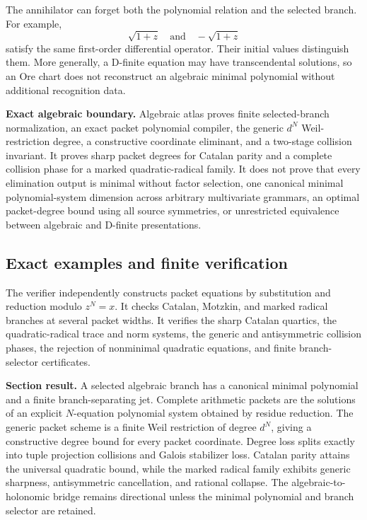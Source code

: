 The annihilator can forget both the polynomial relation and the selected branch.  For example,
\[
 \sqrt{1+z}
 \quad\text{and}\quad
 -\sqrt{1+z}
\]
satisfy the same first-order differential operator.  Their initial values distinguish them.  More generally, a D-finite equation may have transcendental solutions, so an Ore chart does not reconstruct an algebraic minimal polynomial without additional recognition data.

\begin{boundarybox}
\textbf{Exact algebraic boundary.}
Algebraic atlas proves finite selected-branch normalization, an exact packet polynomial compiler, the generic $d^N$ Weil-restriction degree, a constructive coordinate eliminant, and a two-stage collision invariant.  It proves sharp packet degrees for Catalan parity and a complete collision phase for a marked quadratic-radical family.  It does not prove that every elimination output is minimal without factor selection, one canonical minimal polynomial-system dimension across arbitrary multivariate grammars, an optimal packet-degree bound using all source symmetries, or unrestricted equivalence between algebraic and D-finite presentations.
\end{boundarybox}

\subsection{Exact examples and finite verification}
\label{subsec:block10-verification}

The verifier independently constructs packet equations by substitution and reduction modulo $z^N=x$.  It checks Catalan, Motzkin, and marked radical branches at several packet widths.  It verifies the sharp Catalan quartics, the quadratic-radical trace and norm systems, the generic and antisymmetric collision phases, the rejection of nonminimal quadratic equations, and finite branch-selector certificates.

\begin{resultbox}
\textbf{Section result.}
A selected algebraic branch has a canonical minimal polynomial and a finite branch-separating jet.  Complete arithmetic packets are the solutions of an explicit $N$-equation polynomial system obtained by residue reduction.  The generic packet scheme is a finite Weil restriction of degree $d^N$, giving a constructive degree bound for every packet coordinate.  Degree loss splits exactly into tuple projection collisions and Galois stabilizer loss.  Catalan parity attains the universal quadratic bound, while the marked radical family exhibits generic sharpness, antisymmetric cancellation, and rational collapse.  The algebraic-to-holonomic bridge remains directional unless the minimal polynomial and branch selector are retained.
\end{resultbox}




